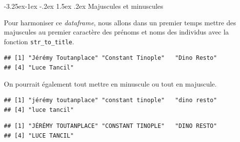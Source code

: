 \documentclass[
  11pt,
  french,
]{book}
\makeatletter
\newenvironment{Shaded}{\begin{snugshade}}{\end{snugshade}}
\newcommand{\KeywordTok}[1]{\textcolor[rgb]{0.13,0.29,0.53}{\textbf{#1}}}
\newcommand{\NormalTok}[1]{#1}
\newcommand{\OperatorTok}[1]{\textcolor[rgb]{0.81,0.36,0.00}{\textbf{#1}}}
\newcommand{\StringTok}[1]{\textcolor[rgb]{0.31,0.60,0.02}{#1}}
\newenvironment{kframe}{%
\medskip{}
\setlength{\fboxsep}{.8em}
 \def\at@end@of@kframe{}%
 \ifinner\ifhmode%
  \def\at@end@of@kframe{\end{minipage}}%
  \begin{minipage}{\columnwidth}%
 \fi\fi%
 \def\FrameCommand##1{\hskip\@totalleftmargin \hskip-\fboxsep
 \colorbox{shadecolor}{##1}\hskip-\fboxsep
     \hskip-\linewidth \hskip-\@totalleftmargin \hskip\columnwidth}%
 \MakeFramed {\advance\hsize-\width
   \@totalleftmargin\z@ \linewidth\hsize
   \@setminipage}}%
 {\par\unskip\endMakeFramed%
 \at@end@of@kframe}
\renewenvironment{Shaded}{\begin{kframe}}{\end{kframe}}
\renewcommand\paragraph{\@startsection{paragraph}{4}{\z@}%
   {-3.25ex\@plus -1ex \@minus -.2ex}%
   {1.5ex \@plus .2ex}%
   {\normalfont\normalsize\bfseries}}
\makeatother
\begin{document}
\hypertarget{sect014251}{%
\paragraph{Majuscules et minuscules}\label{sect014251}}

Pour harmoniser ce \emph{dataframe}, nous allons dans un premier temps mettre des majuscules au premier caractère des prénoms et noms des individus avec la fonction \texttt{str\_to\_title}.

\begin{Shaded}
\end{Shaded}

\begin{verbatim}
## [1] "Jérémy Toutanplace" "Constant Tinople"   "Dino Resto"        
## [4] "Luce Tancil"
\end{verbatim}

On pourrait également tout mettre en minuscule ou tout en majuscule.

\begin{Shaded}
\end{Shaded}

\begin{verbatim}
## [1] "jérémy toutanplace" "constant tinople"   "dino resto"        
## [4] "luce tancil"
\end{verbatim}

\begin{Shaded}
\end{Shaded}

\begin{verbatim}
## [1] "JÉRÉMY TOUTANPLACE" "CONSTANT TINOPLE"   "DINO RESTO"        
## [4] "LUCE TANCIL"
\end{verbatim}
\end{document}
